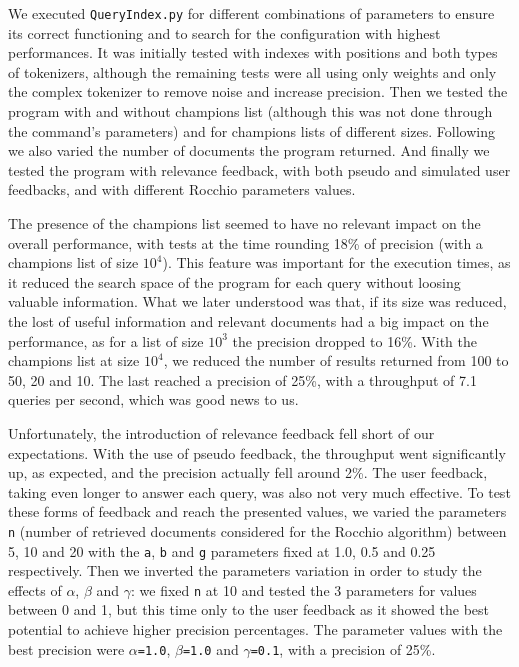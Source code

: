 \documentclass[12pt]{article}
\begin{document}
\newpage
We executed \texttt{QueryIndex.py} for different combinations of parameters to
ensure its correct functioning and to search for the configuration with highest 
performances.
It was initially tested with indexes with positions and both types of tokenizers, 
although the remaining tests were all using only weights
and only the complex tokenizer to remove noise and increase precision.
Then we tested the program with and without champions list (although this was
not done through the command's parameters) and for champions lists of different sizes.
Following we also varied the number of documents the program returned.
And finally we tested the program with relevance feedback, with both pseudo and
simulated user feedbacks, and with different Rocchio parameters values.

The presence of the champions list seemed to have no relevant impact on the 
overall performance, with tests at the time rounding 18\% of precision
(with a champions list of size $10^4$).
This feature was important for the execution times, as it reduced the search 
space of the program for each query without loosing valuable information.
What we later understood was that, if its size was reduced, the lost of useful
information and relevant documents had a big impact on the performance,
as for a list of size $10^3$ the precision dropped to 16\%.
With the champions list at size $10^4$, we reduced the number of results
returned from 100 to 50, 20 and 10. 
The last reached a precision of 25\%, with a throughput of 7.1
queries per second, which was good news to us.

Unfortunately, the introduction of relevance feedback fell short of our expectations.
With the use of pseudo feedback, the throughput went significantly up, as expected,
and the precision actually fell around 2\%.
The user feedback, taking even longer to answer each query, was also not very
much effective.
To test these forms of feedback and reach the presented values, we varied the 
parameters \texttt{n} (number of retrieved documents considered for the Rocchio 
algorithm) between 5, 10 and 20 with the \texttt{a}, \texttt{b} and \texttt{g} 
parameters fixed at 1.0, 0.5 and 0.25 respectively.
Then we inverted the parameters variation in order to study the effects of 
$\alpha$, $\beta$ and $\gamma$: we fixed \texttt{n} at 10 and tested the 3 
parameters for values between 0 and 1, but this time only to the user feedback 
as it showed the best  potential to achieve higher precision percentages.
The parameter values with the best precision were \texttt{$\alpha$=1.0}, 
\texttt{$\beta$=1.0} and \texttt{$\gamma$=0.1}, with a precision of 25\%.
\end{document}
